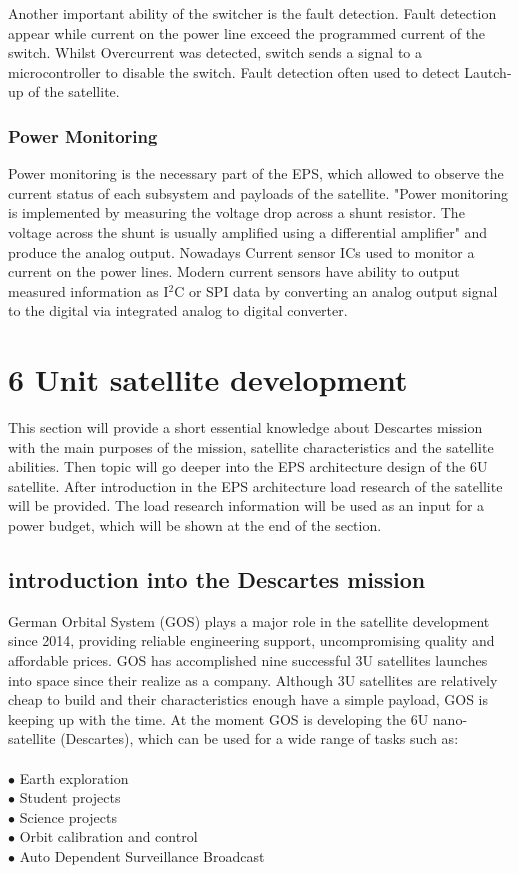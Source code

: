 Another important ability of the switcher is the fault detection. Fault detection appear while current on the power line exceed the programmed current of the switch. Whilst Overcurrent was detected, switch sends a signal to a microcontroller to disable the switch. Fault detection often used to detect Lautch-up of the satellite.\\

\subsubsection{Power Monitoring}

Power monitoring is the necessary part of the EPS, which allowed to observe the current status of each subsystem and payloads of the satellite. \cite{22} "Power monitoring is implemented by measuring the 
voltage drop across a shunt resistor.  The voltage across the shunt  is  usually  amplified  using  a  differential amplifier" and produce the analog output. Nowadays Current sensor ICs used to monitor a current on the power lines. Modern current sensors have ability to output measured information as I$^{2}$C or SPI data by converting an analog output signal to the digital via integrated analog to digital converter. 

\newpage   
\section {6 Unit satellite development}
This section will provide a short essential knowledge about Descartes mission with the main purposes of the mission, satellite characteristics and the satellite  abilities. Then topic will go deeper into the EPS architecture design of the 6U satellite. After introduction in the EPS architecture load research of the satellite will be provided. The load research information will be used as an input for a power budget, which will be shown at the end of the section. \\
\subsection{introduction into the Descartes mission}

German Orbital System (GOS) plays a major role in the satellite development since 2014, providing reliable engineering support, uncompromising quality and affordable prices. GOS has accomplished nine successful 3U satellites launches into space since their realize as a company. Although 3U satellites are relatively cheap to build and their characteristics enough have a simple payload, GOS is keeping up with the time. At the moment GOS is developing the 6U nano-satellite (Descartes), which can be used for a wide range of tasks such as:\\ \\
$\bullet$ Earth exploration\\ 
$\bullet$ Student projects\\ 
$\bullet$ Science projects\\ 
$\bullet$ Orbit calibration and control\\ 
$\bullet$ Auto Dependent Surveillance Broadcast\\ 



